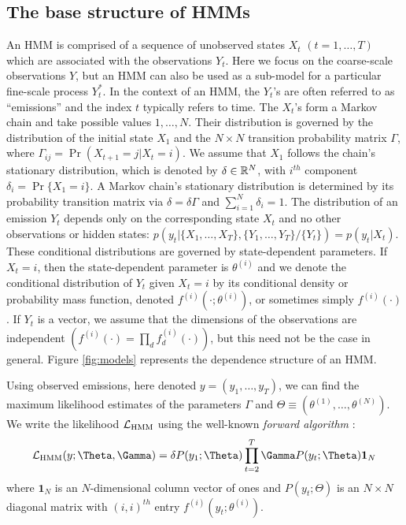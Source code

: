 \subsection{The base structure of HMMs}

An HMM is comprised of a sequence of unobserved states $X_t$ $(t = 1, \ldots, T)$ which are associated with the observations $Y_t$. Here we focus on the coarse-scale observations $Y$, but an HMM can also be used as a sub-model for a particular fine-scale process $Y_t^*$. In the context of an HMM, the $Y_t$'s are often referred to as ``emissions'' and the index $t$ typically refers to time. 
The $X_t$'s form a Markov chain and take possible values $1, \ldots, N$. Their distribution is governed by the distribution of the initial state $X_1$ and the $N \times N$ transition probability matrix $\Gamma$, where $\Gamma_{ij} = \Pr(X_{t+1} = j | X_t = i)$. 
%
We assume that $X_1$ follows the chain's stationary distribution, which is denoted by $\delta \in \mathbb{R}^N$, with $i^{th}$ component
$\delta_i = \Pr\{X_1 = i\}.$
A Markov chain's stationary distribution is determined by its probability transition matrix via $\delta = \delta \Gamma$ and $\sum_{i=1}^N \delta_i = 1$.
%
The distribution of an emission $Y_t$ depends only on the corresponding state $X_t$ and no other observations or hidden states: $p\left(y_t|\{X_1,\ldots, X_T\},\{Y_1,\ldots, Y_T\}/ \{Y_t\}\right) = p(y_t|X_t)$.
%
These conditional distributions are governed by state-dependent parameters. If $X_t = i$, then the state-dependent parameter is $\theta^{(i)}$ and we denote the conditional distribution of $Y_t$ given $X_t=i$ by its conditional density or probability mass function, denoted $f^{(i)}(\cdot ; \theta^{(i)})$, or sometimes simply $f^{(i)}(\cdot)$. If $Y_t$ is a vector, we assume that the dimensions of the observations are independent $\left(f^{(i)}(\cdot) = \prod_{d} f^{(i)}_d(\cdot)\right)$, but this need not be the case in general.
%
Figure \ref{fig:models} represents the dependence structure of an HMM.

Using observed emissions, here denoted $y = (y_1,\ldots,y_T)$, we can find the maximum likelihood estimates of the parameters $\Gamma$ and $\Theta \equiv (\theta^{(1)},\ldots,\theta^{(N)})$. We write the likelihood $\mathcal{L}_{\text{HMM}}$ using the  well-known \textit{forward algorithm} \citep{Zucchini:2016}:
%
$$\calL_{\text{HMM}}(y;\Theta,\Gamma) = \delta P(y_1;\Theta) \prod_{t=2}^T \Gamma P(y_t;\Theta) \mathbf{1}_N$$
%
where $\mathbf{1}_N$ is an $N$-dimensional column vector of ones and
%
$P(y_t;\Theta)$ is an $N \times N$ diagonal matrix with $(i,i)^{th}$ entry  $f^{(i)}(y_t; \theta^{(i)})$.
%


